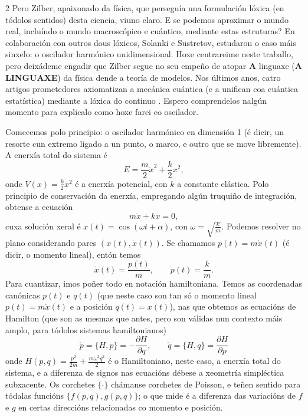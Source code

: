 \begin{multicols}{2}
Pero Zilber, apaixonado da física, que perseguía una formulación lóxica (en
tódolos sentidos) desta ciencia, viuno claro. E se podemos aproximar o mundo
real, incluíndo o mundo macroscópico e cuántico, mediante estas estruturas? En
colaboración con outros dous lóxicos, Solanki e Sustretov, estudaron o caso
máis sinxelo: o oscilador harmónico unidimensional. Hoxe centrareime neste
traballo, pero deixádeme engadir que Zilber segue no seu empeño de atopar
\textbf{A} linguaxe (\textbf{A LINGUAXE}) da física dende a teoría de modelos.
Nos últimos anos, catro artigos prometedores axiomatizan a mecánica cuántica (e
a unifican coa cuántica estatística) mediante a lóxica do continuo
\cite{Zilber1_2025}\cite{Zilber2_2025}\cite{Zilber3_2024}\cite{Zilber_2023}.
Espero comprendelos nalgún momento para explicalo como hoxe farei co oscilador.

Comecemos polo principio: o oscilador harmónico en dimensión 1 (é dicir, un
resorte cun extremo ligado a un punto, o marco, e outro que se move libremente).
A enerxía total do sistema é
%
\begin{equation}
    E=\frac{m}{2}\dot{x}^2+\frac{k}{2}x^2,
\end{equation}
%
onde $V(x)=\frac{k}{2}x^2$ é a enerxía potencial, con $k$ a constante elástica. Polo principio de conservación da enerxía, empregando algún
truquiño de integración, obtense a ecuación
%
\begin{equation}
    m\ddot{x}+kx=0,
\end{equation}
%
cuxa solución xeral é $x(t)=\cos(\omega t+\alpha)$, con
$\omega=\sqrt{\frac{k}{m}}$. Podemos resolver no plano considerando pares
$(x(t),\dot{x}(t))$. Se chamamos $p(t)=m\dot{x}(t)$ (é dicir, o momento
lineal), entón temos
%
\begin{equation}
    \dot{x}(t)=\frac{p(t)}{m},\qquad\dot{p}(t)=\frac{k}{m}.
\end{equation}
%
Para cuantizar, imos poñer todo en notación hamiltoniana. Temos as coordenadas
canónicas $p(t)$ e $q(t)$ (que neste caso son tan só o momento lineal
$p(t)=m\dot{x}(t)$ e a posición $q(t)=x(t)$), nas que obtemos as ecuacións de
Hamilton (que son as mesmas que antes, pero son válidas nun contexto máis
amplo, para tódolos sistemas hamiltonianos)
%
\begin{equation}
    \dot{p}=\{H,p\}=-\frac{\partial H}{\partial q},
    \qquad
    \dot{q}=\{H,q\}=\frac{\partial H}{\partial p}
\end{equation}
%
onde $H(p,q)=\frac{p^2}{2m}+\frac{m\omega^2q^2}{2}$ é o Hamiltoniano, neste
caso, a enerxía total do sistema, e a diferenza de signos nas ecuacións
débese a xeometría simpléctica subxacente. Os corchetes $\{\cdot \}$ chámanse
corchetes de Poisson, e teñen sentido para tódalas funcións
$\{f(p,q),g(p,q)\}$; o que mide é a diferenza das variacións de $f$ e $g$ en 
certas direccións relacionadas co momento e posición.


\end{multicols}
